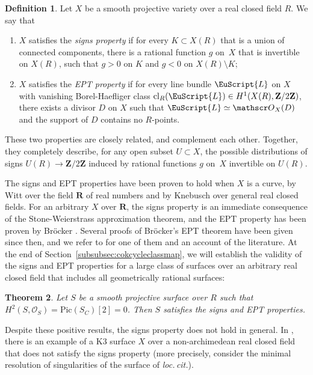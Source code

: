 \documentclass[JEP,XML,SOM,Unicode]{cedram}
\let\mathcal\EuScript
\theoremstyle{plain}
\newtheorem{thm}{Theorem}[section]
\theoremstyle{definition}
\newtheorem{defn}[thm]{Definition}
\numberwithin{equation}{section}
\newcommand{\cl}{{\mathrm{cl}}}
\newcommand{\sO}{{\mathscr O}}
\newcommand{\R}{{\mathbf R}}
\newcommand{\Z}{{\mathbf Z}}
\newcommand{\Pic}{\mathrm{Pic}}
\begin{document}
\label{subsubsec:signsEPT}

\begin{defn}
Let $X$ be a smooth projective variety over a real closed field $R$. We say that
\begin{enumerate}
\item $X$ satisfies the \textit{signs property} if for every $K\subset X(R)$ that is a union of connected components, there is a rational function $g$ on~$X$ that is invertible on $X(R)$, such that $g>0$ on $K$ and $g<0$ on $X(R)\setminus K$;
\item $X$ satisfies the \textit{EPT property} if for every line bundle $\mathcal{L}$ on $X$ with vanishing Borel-Haefliger class $\cl_R(\mathcal{L})\in H^1(X(R),\Z/2\Z)$, there exists a divisor $D$ on $X$ such that $\mathcal{L}\simeq\sO_X(D)$ and the support of $D$ contains no $R$-points.
\end{enumerate}
\end{defn}

These two properties are closely related, and complement each other. Together, they completely describe, for any open subset $U\subset X$, the possible distributions of signs $U(R)\to \Z/2\Z$ induced by rational functions $g$ on~$X$ invertible on $U(R)$.

The signs and EPT properties have been proven to hold when $X$ is a curve, by Witt \cite{wittreel} over the field $\R$ of real numbers and by Knebusch \cite{knebusch1} over general real closed fields. For an arbitrary $X$ over $\R$, the signs property is an immediate consequence of the Stone-Weierstrass
approximation theorem, and the EPT property has been proven by Bröcker \cite{brocker}. Several proofs of Bröcker's EPT theorem have been given since then, and we refer to \cite[\S 4]{scheidererpurity} for one of them and an account of the literature.
At the end of Section~\ref{subsubsec:cokcycleclassmap}, we will establish the validity of the signs and EPT properties for a large class of surfaces over an arbitrary real closed field that includes all geometrically rational surfaces:

\begin{thm}
\label{thm:signsEPTsurfaces}
Let $S$ be a smooth projective surface over $R$ such that $H^2(S,\sO_S)=\Pic(S_C)[2]=0$. Then $S$ satisfies the signs and EPT properties.
\end{thm}

Despite these positive results, the signs property does not hold in general. In \cite[Example 15.2.2]{bcr}, there is an example of a K3 surface $X$ over a non-archimedean real closed field that does not satisfy the signs property (more precisely, consider the minimal resolution of singularities of the surface of \emph{loc.\,cit.}).
\end{document}
